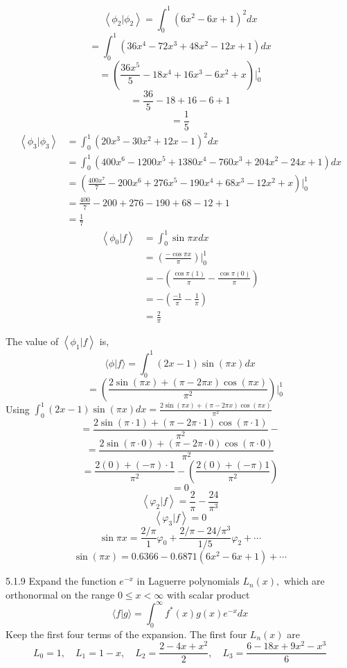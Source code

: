 $$\left\langle\phi_{2} | \phi_{2}\right\rangle =\int_{0}^{1}\left(6 x^{2}-6 x+1\right)^{2} d x$$
$$=\int_{0}^{1}\left(36 x^{4}-72 x^{3}+48 x^{2}-12 x+1\right) d x $$
$$=\left(\frac{36 x^{5}}{5}-18 x^{4}+16 x^{3}-6 x^{2}+x\right)\Bigg|_{0}^{1}$$
$$=\frac{36}{5}-18+16-6+1$$
$$=\frac{1}{5}$$
$$
\begin{aligned}
\left\langle\phi_{3} | \phi_{3}\right\rangle &=\int_{0}^{1}\left(20 x^{3}-30 x^{2}+12 x-1\right)^{2} d x \\
&=\int_{0}^{1}\left(400 x^{6}-1200 x^{5}+1380 x^{4}-760 x^{3}+204 x^{2}-24 x+1\right) d x \\
&=\left(\frac{400 x^{7}}{7}-200 x^{6}+276 x^{5}-190 x^{4}+68 x^{3}-12 x^{2}+x\right)\Bigg|_{0}^{1} \\
&=\frac{400}{7}-200+276-190+68-12+1 \\
&=\frac{1}{7}
\end{aligned}
$$
$$
\begin{aligned}
\left\langle\phi_{0} | f\right\rangle &=\int_{0}^{1} \sin \pi x d x \\
&=\left(\frac{-\cos \pi x}{\pi}\right)\Bigg|_{0}^{1} \\
&=-\left(\frac{\cos \pi(1)}{\pi}-\frac{\cos \pi(0)}{\pi}\right) \\
&=-\left(\frac{-1}{\pi}-\frac{1}{\pi}\right) \\
&=\frac{2}{\pi}
\end{aligned}
$$

The value of $\left\langle\phi_{1} | f\right\rangle$ is,
$$\langle\phi | f\rangle=\int_{0}^{1}(2 x-1) \sin (\pi x) d x$$
$$\quad=\left(\frac{2 \sin (\pi x)+(\pi-2 \pi x) \cos (\pi x)}{\pi^{2}}\right)\Bigg|_{0}^{1}$$
Using $\int_{0}^{1}(2 x-1) \sin (\pi x) d x=\frac{2 \sin (\pi x)+(\pi-2 \pi x) \cos (\pi x)}{\pi^{2}}$
$$=\frac{2 \sin (\pi \cdot 1)+(\pi-2 \pi \cdot 1) \cos (\pi \cdot 1)}{\pi^{2}}-$$
$$=\frac{2 \sin (\pi \cdot 0)+(\pi-2 \pi \cdot 0) \cos (\pi \cdot 0)}{\pi^{2}}$$
$$=\frac{2(0)+(-\pi) \cdot 1}{\pi^{2}}-\left(\frac{2(0)+(-\pi) 1}{\pi^{2}}\right)$$
$$=0$$
$$
\left\langle\varphi_{2} | f\right\rangle=\frac{2}{\pi}-\frac{24}{\pi^{3}}
$$
$$
\left\langle\varphi_{3} | f\right\rangle=0
$$
$$
\sin \pi x=\frac{2 / \pi}{1} \varphi_{0}+\frac{2 / \pi-24 / \pi^{3}}{1 / 5} \varphi_{2}+\cdots
$$
$$\sin(\pi x) =0.6366-0.6871\left(6 x^{2}-6 x+1\right)+\cdots $$

\newpage

\begin{mybox}{5.1.9}
Expand the function $e^{-x}$ in Laguerre polynomials $L_{n}(x),$ which are orthonormal on the range $0 \leq x<\infty$ with scalar product
$$
\langle f | g\rangle=\int_{0}^{\infty} f^{*}(x) g(x) e^{-x} d x
$$
Keep the first four terms of the expansion. The first four $L_{n}(x)$ are
$$
L_{0}=1, \quad L_{1}=1-x, \quad L_{2}=\frac{2-4 x+x^{2}}{2}, \quad L_{3}=\frac{6-18 x+9 x^{2}-x^{3}}{6}
$$
\end{mybox}

